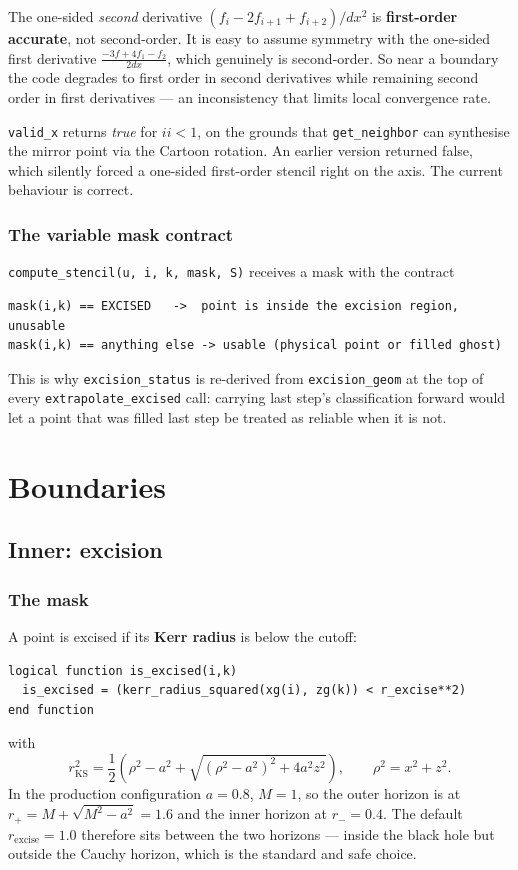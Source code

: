 \gotcha
The one-sided \emph{second} derivative $(f_i - 2f_{i+1} + f_{i+2})/dx^2$ is
\textbf{first-order accurate}, not second-order. It is easy to assume symmetry
with the one-sided first derivative $\frac{-3f+4f_1-f_2}{2dx}$, which genuinely is
second-order. So near a boundary the code degrades to first order in
second derivatives while remaining second order in first derivatives --- an
inconsistency that limits local convergence rate.

\gotcha
\texttt{valid\_x} returns \emph{true} for $ii < 1$, on the grounds that
\texttt{get\_neighbor} can synthesise the mirror point via the Cartoon
rotation. An earlier version returned false, which silently forced a one-sided
first-order stencil right on the axis. The current behaviour is correct.

\subsubsection{The variable mask contract}

\texttt{compute\_stencil(u, i, k, mask, S)} receives a mask with the
contract
\begin{lstlisting}
mask(i,k) == EXCISED   ->  point is inside the excision region, unusable
mask(i,k) == anything else -> usable (physical point or filled ghost)
\end{lstlisting}
This is why \texttt{excision\_status} is re-derived from
\texttt{excision\_geom} at the top of every \texttt{extrapolate\_excised}
call: carrying last step's classification forward would let a point that was
filled last step be treated as reliable when it is not.

\section{Boundaries}
\label{ch:bcs}

\subsection{Inner: excision}

\subsubsection{The mask}

A point is excised if its \textbf{Kerr radius} is below the cutoff:
\begin{lstlisting}
logical function is_excised(i,k)
  is_excised = (kerr_radius_squared(xg(i), zg(k)) < r_excise**2)
end function
\end{lstlisting}
with
\begin{equation}
r^2_{\mathrm{KS}} = \frac{1}{2}\left(\rho^2 - a^2
  + \sqrt{(\rho^2-a^2)^2 + 4a^2z^2}\right),
\qquad \rho^2 = x^2 + z^2 .
\end{equation}
In the production configuration $a = 0.8$, $M = 1$, so the outer horizon is
at $r_+ = M + \sqrt{M^2 - a^2} = 1.6$ and the inner horizon at $r_- = 0.4$.
The default $r_{\mathrm{excise}} = 1.0$ therefore sits between the two
horizons --- inside the black hole but outside the Cauchy horizon, which is the
standard and safe choice.

